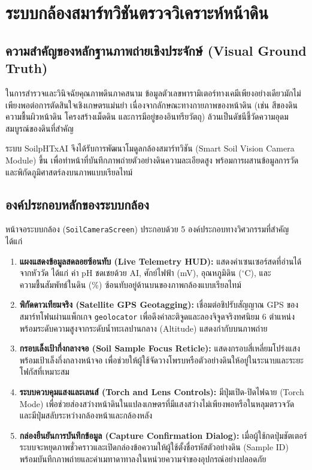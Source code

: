 \chapter{ระบบกล้องสมาร์ทวิชันตรวจวิเคราะห์หน้าดิน}
\label{chap:camera_vision}

\section{ความสำคัญของหลักฐานภาพถ่ายเชิงประจักษ์ (Visual Ground Truth)}
ในการสำรวจและวินิจฉัยคุณภาพดินภาคสนาม ข้อมูลตัวเลขพารามิเตอร์ทางเคมีเพียงอย่างเดียวมักไม่เพียงพอต่อการตัดสินใจเชิงเกษตรแม่นยำ เนื่องจากลักษณะทางกายภาพของหน้าดิน (เช่น สีของดิน ความชื้นผิวหน้าดิน โครงสร้างเม็ดดิน และการมีอยู่ของอินทรียวัตถุ) ล้วนเป็นดัชนีชี้วัดความอุดมสมบูรณ์ของดินที่สำคัญ

ระบบ SoilpHTxAI จึงได้รับการพัฒนาโมดูลกล้องสมาร์ทวิชัน (Smart Soil Vision Camera Module) ขึ้น เพื่อทำหน้าที่บันทึกภาพถ่ายตัวอย่างดินความละเอียดสูง พร้อมการผสานข้อมูลการวัดและพิกัดภูมิศาสตร์ลงบนภาพแบบเรียลไทม์

\section{องค์ประกอบหลักของระบบกล้อง}
หน้าจอระบบกล้อง (\texttt{SoilCameraScreen}) ประกอบด้วย 5 องค์ประกอบทางวิศวกรรมที่สำคัญ ได้แก่
\begin{enumerate}
    \item \textbf{แผงแสดงข้อมูลสดลอยซ้อนทับ (Live Telemetry HUD):} แสดงค่าเซนเซอร์สดที่อ่านได้จากหัววัด ได้แก่ ค่า pH ชดเชยด้วย AI, ศักย์ไฟฟ้า (mV), อุณหภูมิดิน ($^\circ\text{C}$), และความชื้นสัมพัทธ์ในดิน (\%) ซ้อนทับอยู่ด้านบนของภาพกล้องแบบเรียลไทม์
    \item \textbf{พิกัดดาวเทียมจริง (Satellite GPS Geotagging):} เชื่อมต่อชิปรับสัญญาณ GPS ของสมาร์ทโฟนผ่านแพ็กเกจ \texttt{geolocator} เพื่อดึงค่าละติจูดและลองจิจูดจริงทศนิยม 6 ตำแหน่ง พร้อมระดับความสูงจากระดับน้ำทะเลปานกลาง (Altitude) แสดงกำกับบนภาพถ่าย
    \item \textbf{กรอบเล็งเป้ากึ่งกลางจอ (Soil Sample Focus Reticle):} แสดงกรอบสี่เหลี่ยมโปร่งแสงพร้อมเป้าเล็งกึ่งกลางหน้าจอ เพื่อช่วยให้ผู้ใช้จัดวางโพรบหรือตัวอย่างดินให้อยู่ในระนาบและระยะโฟกัสที่เหมาะสม
    \item \textbf{ระบบควบคุมแสงและเลนส์ (Torch and Lens Controls):} มีปุ่มเปิด-ปิดไฟฉาย (Torch Mode) เพื่อช่วยส่องสว่างหน้าดินในแปลงเกษตรที่มีแสงสว่างไม่เพียงพอหรือในหลุมตรวจวัด และมีปุ่มสลับระหว่างกล้องหน้าและกล้องหลัง
    \item \textbf{กล่องยืนยันการบันทึกข้อมูล (Capture Confirmation Dialog):} เมื่อผู้ใช้กดปุ่มชัตเตอร์ ระบบจะหยุดภาพชั่วคราวและเปิดกล่องข้อความให้ผู้ใช้ตั้งชื่อรหัสตัวอย่างดิน (Sample ID) พร้อมบันทึกภาพถ่ายและค่าเมทาดาทาลงในหน่วยความจำของอุปกรณ์อย่างปลอดภัย
\end{enumerate}

